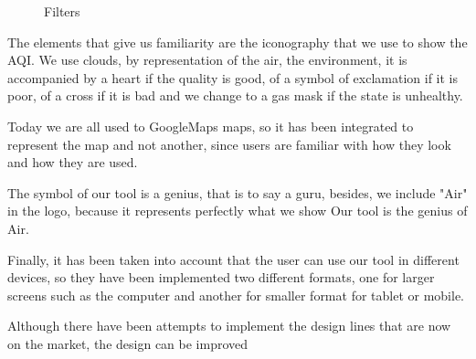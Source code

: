 \begin{figure}[ht]
    \centering
    \hfill
    \vfill
  
  \caption{Filters}
    \end{figure}
    The elements that give us familiarity are the iconography that we use to show the AQI. We use clouds, by representation
    of the air, the environment, it is accompanied by a heart if the quality is good, of a symbol of exclamation if it is poor, of a cross if it is
    bad and we change to a gas mask if the state is unhealthy.
    
    Today we are all used to GoogleMaps maps, so it has been integrated to represent the map and not another,
    since users are familiar with how they look and how they are used.
    
    The symbol of our tool is a genius, that is to say a guru, besides, we include "Air" in the logo, because it represents perfectly
    what we show Our tool is the genius of Air.
    
    Finally, it has been taken into account that the user can use our tool in different devices, so they have been implemented
    two different formats, one for larger screens such as the computer and another for smaller format for tablet or mobile.
\begin{itemize}
    \done
    \crossed Although there have been attempts to implement the design lines that are now on the market, the design can be improved
    
\end{itemize}
\newpage